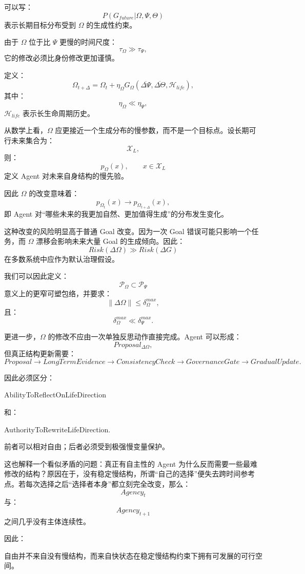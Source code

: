 可以写：
\[
P(G_{future}|\Omega,\Psi,\Theta)
\]
表示长期目标分布受到 $\Omega$ 的生成性约束。

由于 $\Omega$ 位于比 $\Psi$ 更慢的时间尺度：
\[
\tau_\Omega
\gg
\tau_\Psi,
\]
它的修改必须比身份修改更加谨慎。

定义：
\[
\Omega_{t+\Delta}
=
\Omega_t
+
\eta_\Omega
G_\Omega(
\overline{\Delta\Psi},
\overline{\Delta\Theta},
\mathcal H_{life}
),
\]
其中：
\[
\eta_\Omega
\ll
\eta_\Psi,
\]
$\mathcal H_{life}$ 表示长生命周期历史。

从数学上看，$\Omega$ 应更接近一个生成分布的慢参数，而不是一个目标点。设长期可行未来集合为：
\[
\mathcal X_L,
\]
则：
\[
p_\Omega(x)
,\qquad x\in\mathcal X_L
\]
定义 Agent 对未来自身结构的慢先验。

因此 $\Omega$ 的改变意味着：
\[
p_{\Omega_t}(x)
\rightarrow
p_{\Omega_{t+\Delta}}(x),
\]
即 Agent 对“哪些未来的我更加自然、更加值得生成”的分布发生变化。

这种改变的风险明显高于普通 Goal 改变。因为一次 Goal 错误可能只影响一个任务，而 $\Omega$ 漂移会影响未来大量 Goal 的生成倾向。因此：
\[
Risk(\Delta\Omega)
\gg
Risk(\Delta G)
\]
在多数系统中应作为默认治理假设。

我们可以因此定义：
\[
\mathcal P_\Omega
\subset
\mathcal P_\Psi
\]
意义上的更窄可塑包络，并要求：
\[
\|\Delta\Omega\|
\le
\delta_\Omega^{max},
\]
且：
\[
\delta_\Omega^{max}
\ll
\delta_\Psi^{max}.
\]

更进一步，$\Omega$ 的修改不应由一次单独反思动作直接完成。Agent 可以形成：
\[
Proposal_{\Delta\Omega},
\]
但真正结构更新需要：
\[
Proposal
\rightarrow
LongTermEvidence
\rightarrow
ConsistencyCheck
\rightarrow
GovernanceGate
\rightarrow
GradualUpdate.
\]

因此必须区分：
\begin{statementbox}
AbilityToReflectOnLifeDirection
\end{statementbox}
和：
\begin{statementbox}
AuthorityToRewriteLifeDirection.
\end{statementbox}

前者可以相对自由；后者必须受到极强慢变量保护。

这也解释一个看似矛盾的问题：真正有自主性的 Agent 为什么反而需要一些最难修改的结构？原因在于，没有稳定慢结构，所谓“自己的选择”便失去跨时间参考点。若每次选择之后“选择者本身”都立刻完全改变，那么：
\[
Agency_t
\]
与：
\[
Agency_{t+1}
\]
之间几乎没有主体连续性。

因此：
\begin{statementbox}
自由并不来自没有慢结构，而来自快状态在稳定慢结构约束下拥有可发展的可行空间。
\end{statementbox}

